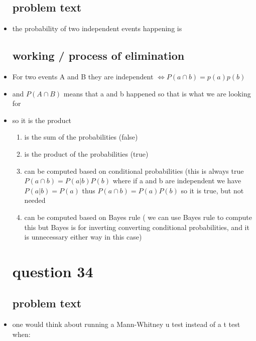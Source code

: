 \documentclass{article}
\begin{document}
\begin{itemize}
\subsection{problem text}
\item the probability of two independent events happening is 
\subsection{working / process of elimination }
\item For two events A and B they are independent $  \iff P(a\cap b)=p(a)p(b)$ 
\item and $P(A\cap B)$ means that a and b happened so that is what we are looking for 
\item so it is the product 
\begin{enumerate}
    \item is the sum of the probabilities (false)
    \item is the product of the probabilities (true) 
    \item can be computed based on conditional probabilities (this is always true $P(a\cap b)=P(a|b)P(b)$ where if a and b are independent we have $P(a|b)=P(a)$  thus  $P(a\cap b)=P(a)P(b)$ so it is true, but not needed 
    \item can be computed based on Bayes rule ( we can use Bayes rule to compute this but Bayes is for inverting converting conditional probabilities, and it is unnecessary either way in this case)  
\end{enumerate}

\section{question 34}
\subsection{problem text}
\item one would think about running a Mann-Whitney u test instead of a t test when: 

\end{itemize}
\end{document}
